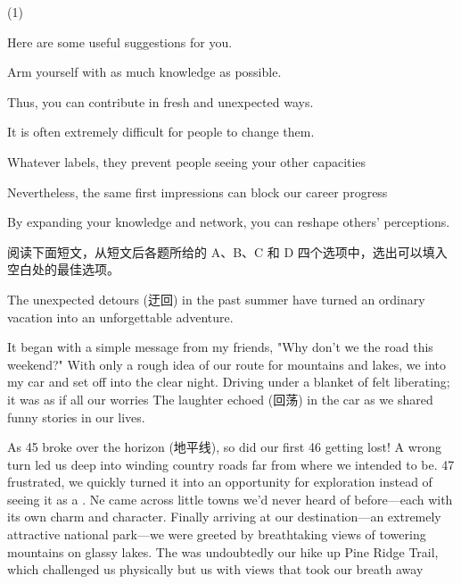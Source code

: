 \documentclass{英语试卷}
\begin{document}
\begin{choices}(1)
  \item Here are some useful suggestions for you.
  \item Arm yourself with as much knowledge as possible.
  \item Thus, you can contribute in fresh and unexpected ways.
  \item It is often extremely difficult for people to change them.
  \item Whatever labels, they prevent people seeing your other capacities
  \item Nevertheless, the same first impressions can block our career progress
  \item By expanding your knowledge and network, you can reshape others' perceptions.
\end{choices}
\par 阅读下面短文，从短文后各题所给的 A、B、C 和 D 四个选项中，选出可以填入空白处的最佳选项。\par
\par The unexpected detours (迂回) in the past summer have turned an ordinary vacation into an unforgettable adventure.\par
\par It began with a simple message from my friends, "Why don't we  the road this weekend?" With only a rough idea of our route for mountains and lakes, we  into my car and set off into the clear night. Driving under a blanket of  felt liberating; it was as if all our worries  The laughter echoed (回荡) in the car as we shared funny stories in our lives.\par
\par As 45 broke over the horizon (地平线), so did our first 46 getting lost! A wrong turn led us deep into winding country roads far from where we intended to be. 47 frustrated, we quickly turned it into an opportunity for exploration instead of seeing it as a  . Ne came across little towns we'd never heard of before—each with its own charm and character. Finally arriving at our  destination—an extremely attractive national park—we were greeted by breathtaking views of towering mountains  on glassy lakes. The  was undoubtedly our hike up Pine Ridge Trail, which challenged us physically but  us with views that took our breath away\par
\end{document}
